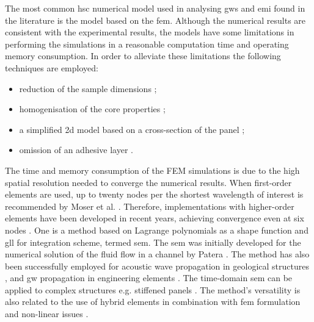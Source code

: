 The most common \ac{hsc} numerical model used in analysing \acp{gw} and \ac{emi} found in the literature is the model based on the \ac{fem}.
Although the numerical results are consistent with the experimental results, the models have some limitations in performing the simulations in a reasonable computation time and operating memory consumption.
In order to alleviate these limitations the following techniques are employed:
\begin{itemize}
\item reduction of the sample dimensions \cite{hosseini2013numerical, tian2015wavenumber};
\item homogenisation of the core properties \cite{catapano2014multi, zhou2020debonding};
\item a simplified \ac{2d} model based on a cross-section of the panel \cite{li2019detection};
\item omission of an adhesive layer \cite{mustapha2013non}.
\end{itemize}
The time and memory consumption of the FEM simulations is due to the high spatial resolution needed to converge the numerical results.
When first-order elements are used, up to twenty nodes per the shortest wavelength of interest is recommended by Moser et al. \cite{moser1999modeling}.
Therefore, implementations with higher-order elements have been developed in recent years, achieving convergence even at six nodes \cite{willberg2012comparison}.
One is a method based on Lagrange polynomials as a shape function and \ac{gll} for integration scheme, termed \ac{sem}.
The \ac{sem} was initially developed for the numerical solution of the fluid flow in a channel by Patera \cite{patera1984spectral}.
The method has also been successfully employed for acoustic wave propagation in geological structures \cite{seriani1994spectral, komatitsch2000simulation},  and \ac{gw} propagation in engineering elements \cite{kudela2007wave, ostachowicz2011guided, rucka2010experimental,rekatsinas2017cubic}.
The time-domain \ac{sem} can be applied to complex structures e.g. stiffened panels \cite{schulte2011simulation, lonkar2014modeling}.
The method's versatility is also related to the use of hybrid elements in combination with \ac{fem} formulation \cite{ha2009optimizing} and non-linear issues \cite{yu2020time, li2021hybrid}.

